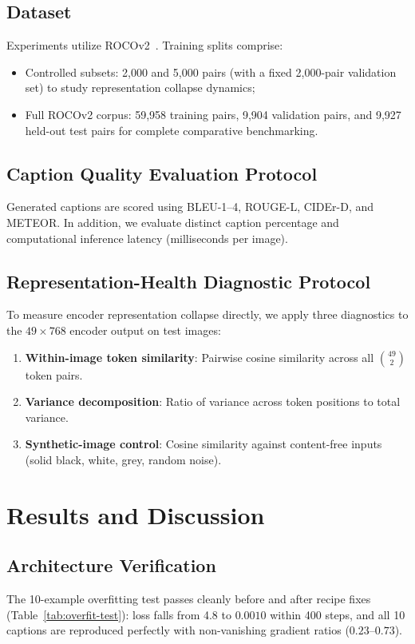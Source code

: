 \documentclass[conference]{IEEEtran}
\begin{document}
\subsection{Dataset}
Experiments utilize ROCOv2~\cite{ruckert2024rocov2}. Training splits comprise:
\begin{itemize}
    \item Controlled subsets: 2,000 and 5,000 pairs (with a fixed 2,000-pair validation set) to study representation collapse dynamics;
    \item Full ROCOv2 corpus: 59,958 training pairs, 9,904 validation pairs, and 9,927 held-out test pairs for complete comparative benchmarking.
\end{itemize}

\subsection{Caption Quality Evaluation Protocol}
\label{sec:experiments-eval}
Generated captions are scored using BLEU-1--4, ROUGE-L, CIDEr-D, and METEOR. In addition, we evaluate distinct caption percentage and computational inference latency (milliseconds per image).

\subsection{Representation-Health Diagnostic Protocol}
\label{sec:experiments-collapse}
To measure encoder representation collapse directly, we apply three diagnostics to the $49\times768$ encoder output on test images:
\begin{enumerate}
    \item \textbf{Within-image token similarity}: Pairwise cosine similarity across all $\binom{49}{2}$ token pairs.
    \item \textbf{Variance decomposition}: Ratio of variance across token positions to total variance.
    \item \textbf{Synthetic-image control}: Cosine similarity against content-free inputs (solid black, white, grey, random noise).
\end{enumerate}

\section{Results and Discussion}
\label{sec:results}

\subsection{Architecture Verification}
\label{sec:results-verify}
The 10-example overfitting test passes cleanly before and after recipe fixes (Table~\ref{tab:overfit-test}): loss falls from 4.8 to $0.0010$ within 400 steps, and all 10 captions are reproduced perfectly with non-vanishing gradient ratios ($0.23$--$0.73$).
\end{document}
